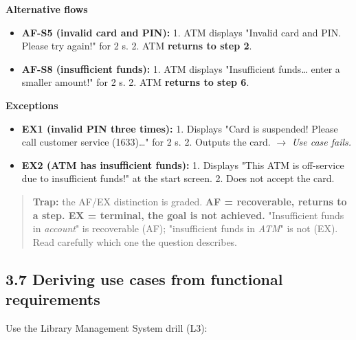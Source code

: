\begin{studycolumns}
\vspace{0pt}

\textbf{Alternative flows}

\begin{itemize}
\item \textbf{AF-S5 (invalid card and PIN):} 1. ATM displays "Invalid card and PIN. Please try again!" for 2 s. 2. ATM \textbf{returns to step 2}.
\item \textbf{AF-S8 (insufficient funds):} 1. ATM displays "Insufficient funds\ldots{} enter a smaller amount!" for 2 s. 2. ATM \textbf{returns to step 6}.
\end{itemize}
\textbf{Exceptions}

\begin{itemize}
\item \textbf{EX1 (invalid PIN three times):} 1. Displays "Card is suspended! Please call customer service (1633)\ldots{}" for 2 s. 2. Outputs the card. \ensuremath{\rightarrow} \emph{Use case fails.}
\item \textbf{EX2 (ATM has insufficient funds):} 1. Displays "This ATM is off-service due to insufficient funds!" at the start screen. 2. Does not accept the card.
\end{itemize}

\begin{quote}\small\color{navy}
\textbf{Trap:} the AF/\allowbreak{}EX distinction is graded. \textbf{AF = recoverable, returns to a step. EX = terminal, the goal is not achieved.} "Insufficient funds in \emph{account}" is recoverable (AF); "insufficient funds in \emph{ATM}" is not (EX). Read carefully which one the question describes.

\end{quote}
\subsection*{3.7 Deriving use cases from functional requirements}
Use the Library Management System drill (L3):
\end{studycolumns}


